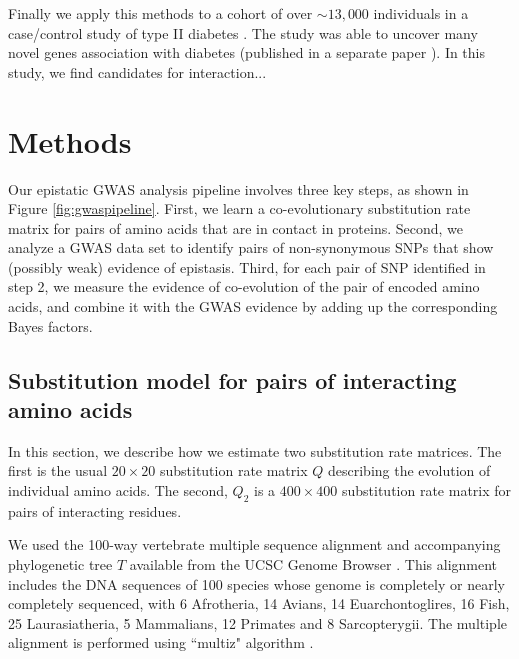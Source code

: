 Finally we apply this methods to a cohort of over $\sim 13,000$ individuals in a case/control study of type II diabetes \cite{mccarthy2015T2D}.
The study was able to uncover many novel genes association with diabetes (published in a separate paper \cite{mccarthy2015T2D}). 
{\huge In this study, we find candidates for interaction...}

\section{Methods}

Our epistatic GWAS analysis pipeline involves three key steps, as shown in Figure \ref{fig:gwaspipeline}. First, we learn a co-evolutionary substitution rate matrix for pairs of amino acids that are in contact in proteins. Second, we analyze a GWAS data set to identify pairs of non-synonymous SNPs that show (possibly weak) evidence of epistasis. Third, for each pair of SNP identified in step 2, we measure the evidence of co-evolution of the pair of encoded amino acids, and combine it with the GWAS evidence by adding up the corresponding Bayes factors.


\subsection{Substitution model for pairs of interacting amino acids}

In this section, we describe how we estimate two substitution rate matrices. The first is the usual $20 \times 20$ substitution rate matrix $Q$ describing the evolution of individual amino acids. The second, $Q_2$ is a $400 \times 400$ substitution rate matrix for pairs of interacting residues. 

We used the 100-way vertebrate multiple sequence alignment and accompanying phylogenetic tree $T$ available from the UCSC Genome Browser \cite{karolchik2014ucsc}. This alignment includes the DNA sequences of 100 species whose genome is completely or nearly completely sequenced, with 6 Afrotheria, 14 Avians, 14 Euarchontoglires, 16 Fish, 25 Laurasiatheria, 5 Mammalians, 12 Primates and 8 Sarcopterygii. The multiple alignment is performed using ``multiz" algorithm \cite{blanchette2004aligning,kielbasa2011adaptive}.

